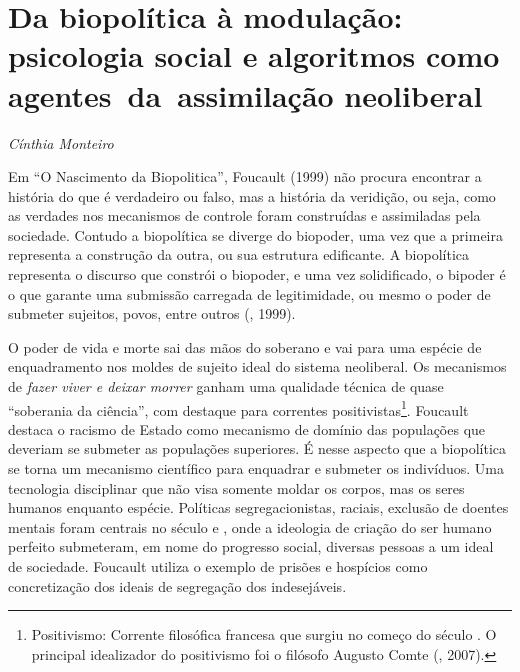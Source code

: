 \chapter{Da biopolítica à modulação:\\ psicologia social e algoritmos como agentes~da~assimilação neoliberal}

\begin{flushright}
\emph{Cínthia Monteiro}
\end{flushright}

Em ``O Nascimento da Biopolitica'', Foucault (1999) não procura
encontrar a história do que é verdadeiro ou falso, mas a história da
veridição, ou seja, como as verdades nos mecanismos de controle foram
construídas e assimiladas pela sociedade. Contudo a biopolítica se
diverge do biopoder, uma vez que a primeira representa a construção da
outra, ou sua estrutura edificante. A biopolítica representa o discurso
que constrói o biopoder, e uma vez solidificado, o bipoder é o que
garante uma submissão carregada de legitimidade, ou mesmo o poder de
submeter sujeitos, povos, entre outros (, 1999).

O poder de vida e morte sai das mãos do soberano e vai para uma espécie
de enquadramento nos moldes de sujeito ideal do sistema neoliberal. Os
mecanismos de \emph{fazer viver e deixar morrer} ganham uma qualidade
técnica de quase ``soberania da ciência'', com destaque para correntes
positivistas\footnote{Positivismo: Corrente filosófica francesa que
  surgiu no começo do século . O principal idealizador do positivismo
  foi o filósofo Augusto Comte (, 2007).}. Foucault destaca o
racismo de Estado como mecanismo de domínio das populações que deveriam
se submeter as populações superiores. É nesse aspecto que a biopolítica
se torna um mecanismo científico para enquadrar e submeter os
indivíduos. Uma tecnologia disciplinar que não visa somente moldar os
corpos, mas os seres humanos enquanto espécie. Políticas
segregacionistas, raciais, exclusão de doentes mentais foram centrais no
século  e , onde a ideologia de criação do ser humano perfeito
submeteram, em nome do progresso social, diversas pessoas a um
ideal de sociedade. Foucault utiliza o exemplo de prisões e hospícios
como concretização dos ideais de segregação dos indesejáveis.

